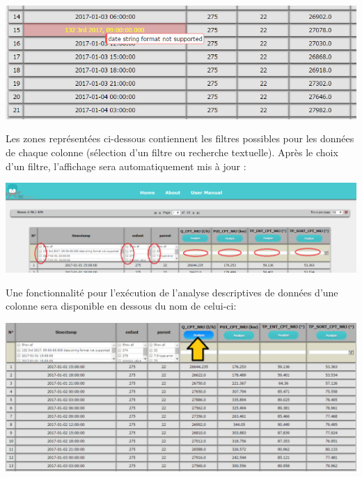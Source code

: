 		\begin{center}\includegraphics[scale=0.45]{fenetre2Erreur.png}\end{center}
		
		Les zones représentées ci-dessous contiennent les filtres possibles pour les données de chaque colonne (sélection d'un filtre ou recherche textuelle). Après le choix d'un filtre, l'affichage sera automatiquement mis à jour :\\
		
		\begin{center}\includegraphics[scale=0.45]{fenetre2Filtre.png}\end{center}
		
		Une fonctionnalité pour l'exécution de l'analyse descriptives de données d'une colonne sera disponible en dessous du nom de celui-ci:   \\
		
		\begin{center}\includegraphics[scale=0.45]{fenetre2Analyse.png}\end{center}
		
		
